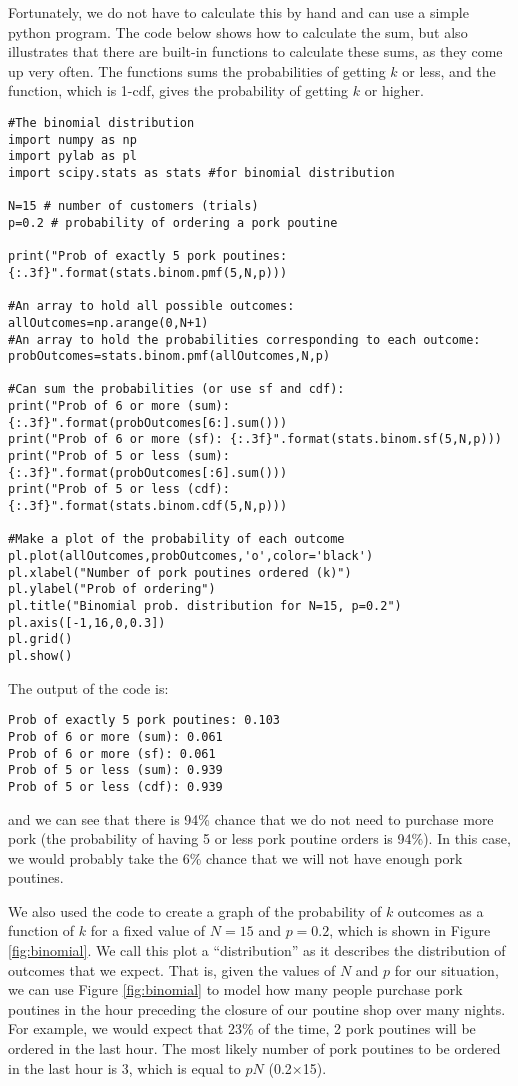 Fortunately, we do not have to calculate this by hand and can use a simple python program. The code below shows how to calculate the sum, but also illustrates that there are built-in functions to calculate these sums, as they come up very often. The  functions sums the probabilities of getting $k$ or less, and the  function, which is 1-cdf, gives the probability of getting $k$ or higher.
\begin{lstlisting}[frame=single] 
#The binomial distribution
import numpy as np
import pylab as pl
import scipy.stats as stats #for binomial distribution

N=15 # number of customers (trials)
p=0.2 # probability of ordering a pork poutine

print("Prob of exactly 5 pork poutines: {:.3f}".format(stats.binom.pmf(5,N,p)))

#An array to hold all possible outcomes:
allOutcomes=np.arange(0,N+1)
#An array to hold the probabilities corresponding to each outcome:
probOutcomes=stats.binom.pmf(allOutcomes,N,p)

#Can sum the probabilities (or use sf and cdf):
print("Prob of 6 or more (sum): {:.3f}".format(probOutcomes[6:].sum()))
print("Prob of 6 or more (sf): {:.3f}".format(stats.binom.sf(5,N,p)))
print("Prob of 5 or less (sum): {:.3f}".format(probOutcomes[:6].sum()))
print("Prob of 5 or less (cdf): {:.3f}".format(stats.binom.cdf(5,N,p)))

#Make a plot of the probability of each outcome
pl.plot(allOutcomes,probOutcomes,'o',color='black')
pl.xlabel("Number of pork poutines ordered (k)")
pl.ylabel("Prob of ordering")
pl.title("Binomial prob. distribution for N=15, p=0.2")
pl.axis([-1,16,0,0.3])
pl.grid()
pl.show()
\end{lstlisting}
The output of the code is:
\begin{verbatim}
Prob of exactly 5 pork poutines: 0.103
Prob of 6 or more (sum): 0.061
Prob of 6 or more (sf): 0.061
Prob of 5 or less (sum): 0.939
Prob of 5 or less (cdf): 0.939
\end{verbatim}
and we can see that there is 94\% chance that we do not need to purchase more pork (the probability of having 5 or less pork poutine orders is 94\%). In this case, we would probably take the 6\% chance that we will not have enough pork poutines.

We also used the code to create a graph of the probability of $k$ outcomes as a function of $k$ for a fixed value of $N=15$ and $p=0.2$, which is shown in Figure \ref{fig:binomial}. We call this plot a ``distribution'' as it describes the distribution of outcomes that we expect. That is, given the values of $N$ and $p$ for our situation, we can use Figure \ref{fig:binomial} to model how many people purchase pork poutines in the hour preceding the closure of our poutine shop over many nights. For example, we would expect that 23\% of the time, 2 pork poutines will be ordered in the last hour. The most likely number of pork poutines to be ordered in the last hour is 3, which is equal to $pN$ (0.2$\times$15).

